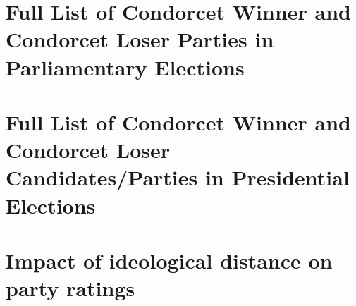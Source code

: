 \documentclass[12pt]{scrartcl}
\begin{document}
\section{Full List of Condorcet Winner and Condorcet Loser Parties in Parliamentary Elections}
%	
	
\newpage
\section{Full List of Condorcet Winner and Condorcet Loser Candidates/Parties in Presidential Elections}

%

\newpage
\section{Impact of ideological distance on party ratings}\label{app.IdeolDist}

\renewcommand{\thetable}{D} 


\end{document}
